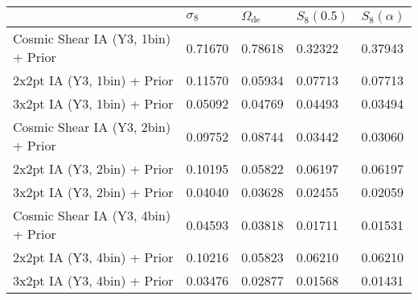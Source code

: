 \begin{tabular}{lllll}
\toprule
{} & $\sigma_8$ & $\Omega_\mathrm{de}$ & $S_8(0.5)$ & $S_8(\alpha)$ \\
\midrule
Cosmic Shear IA (Y3, 1bin) + Prior &    0.71670 &              0.78618 &    0.32322 &       0.37943 \\
2x2pt IA (Y3, 1bin) + Prior        &    0.11570 &              0.05934 &    0.07713 &       0.07713 \\
3x2pt IA (Y3, 1bin) + Prior        &    0.05092 &              0.04769 &    0.04493 &       0.03494 \\
Cosmic Shear IA (Y3, 2bin) + Prior &    0.09752 &              0.08744 &    0.03442 &       0.03060 \\
2x2pt IA (Y3, 2bin) + Prior        &    0.10195 &              0.05822 &    0.06197 &       0.06197 \\
3x2pt IA (Y3, 2bin) + Prior        &    0.04040 &              0.03628 &    0.02455 &       0.02059 \\
Cosmic Shear IA (Y3, 4bin) + Prior &    0.04593 &              0.03818 &    0.01711 &       0.01531 \\
2x2pt IA (Y3, 4bin) + Prior        &    0.10216 &              0.05823 &    0.06210 &       0.06210 \\
3x2pt IA (Y3, 4bin) + Prior        &    0.03476 &              0.02877 &    0.01568 &       0.01431 \\
\bottomrule
\end{tabular}
